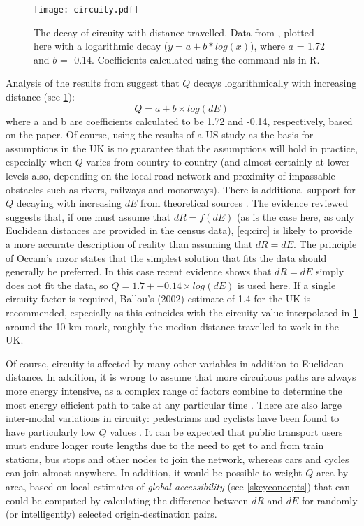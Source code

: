 \begin{figure}[h]
 \centering
 \texttt{[image: circuity.pdf]}
 \caption[The decay of circuity with distance travelled]{The decay of circuity
with distance travelled. Data from
\citep{Levinson2009}, plotted here with a logarithmic decay ($y = a +
b*log(x)$), where $a$ = 1.72 and $b$ = -0.14. Coefficients calculated using the
command nls in R.}
 \label{fig:circuity}
\end{figure}

Analysis of the results from \citet{Levinson2009} suggest that $Q$ decays
logarithmically with increasing distance (see \cref{fig:circuity}):
\begin{equation}
Q = a + b \times log(dE)
\label{eq:circ}
\end{equation}
where a and b are coefficients calculated to be 1.72 and -0.14, respectively,
based on the \citet{Levinson2009} paper. Of course, using the results of
a US study as the basis for assumptions in the UK is no guarantee that the
assumptions will hold in practice, especially when
$Q$ varies from country to country (and almost certainly at lower levels also,
depending on the local road network and proximity of impassable obstacles
such as rivers, railways and motorways). There is additional support
for $Q$ decaying with increasing $dE$ from 
theoretical sources \citep{Barthelemy2011}.
The evidence reviewed suggests that, if one must
assume that $dR = f(dE)$ (as is the case here, as only Euclidean distances are
provided in the census data), \cref{eq:circ} is likely to
provide a more accurate description of reality than assuming that $dR = dE$.
The principle of Occam's razor states that the simplest solution that
fits the data should generally be preferred. In this case
recent evidence shows that $dR = dE$ simply
does not fit the data, so $Q = 1.7 + -0.14 \times log(dE)$
is used here. If a single circuity factor is required, Ballou's (2002) estimate
of 1.4 for the UK is recommended, especially as this coincides
with the circuity value interpolated in \cref{fig:circuity} around the 10 km
mark, roughly the median distance travelled to work in the UK.

Of course, circuity is affected by many other variables in addition to
Euclidean distance. In addition, it is wrong to assume that
more circuitous paths are always more energy intensive, as a complex
range of factors combine to determine the most energy efficient path
to take at any particular time \citep{Ericsson2006}. There are also large
inter-modal variations in circuity: pedestrians
and cyclists have been found to have particularly low $Q$ values \citep{Iacono2010}.
It can be expected that public transport users must endure longer route lengths
due to the need to get to and from train stations, bus stops and other
nodes to join the network, whereas cars and cycles can join almost anywhere.
In addition, it would be possible to weight $Q$ area by area, based on local
estimates of \emph{global accessibility} (see \cref{skeyconcepts})
that can could be computed by calculating the difference between $dR$ and
$dE$ for randomly (or intelligently) selected origin-destination pairs.

